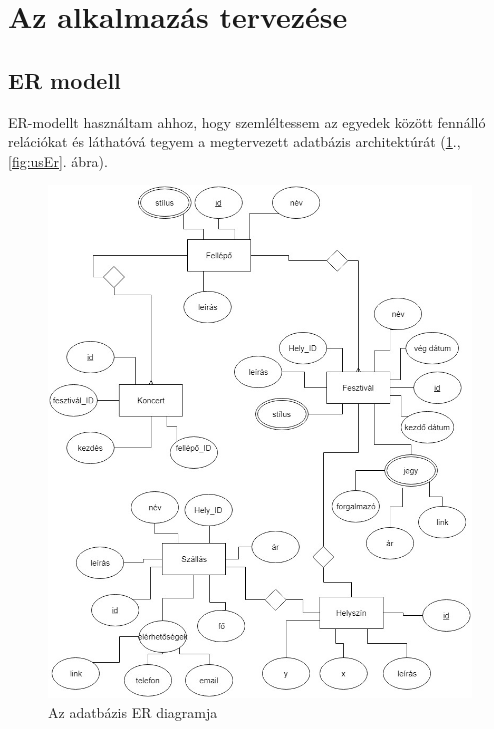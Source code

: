 \section{Az alkalmazás tervezése}

\subsection{ER modell}

ER-modellt használtam ahhoz, hogy szemléltessem az egyedek között fennálló relációkat és láthatóvá tegyem a megtervezett adatbázis architektúrát (\ref{fig:er}., \ref{fig:usEr}. ábra).

\begin{figure}
\centering
\includegraphics[scale=0.6]{kepek/er.jpg}
\caption{Az adatbázis ER diagramja}
\label{fig:er}
\end{figure}

